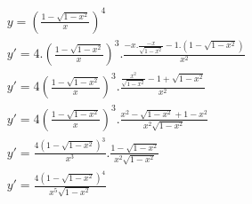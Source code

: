 \begin{ex}
\begin{align}
&y=\left(\frac{1-\sqrt{1-x^2}}{x}\right)^4\nonumber\\
&y'=4.\left(\frac{1-\sqrt{1-x^2}}{x}\right)^3.\frac{-x.\frac{-x}{\sqrt{1-x^2}}-1.(1-\sqrt{1-x^2})}{x^2}\nonumber\\
&y'=4\left(\frac{1-\sqrt{1-x^2}}{x}\right)^3.\frac{\frac{x^2}{\sqrt{1-x^2}}-1+\sqrt{1-x^2}}{x^2}\nonumber\\
&y'=4\left(\frac{1-\sqrt{1-x^2}}{x}\right)^3.\frac{x^2-\sqrt{1-x^2}+1-x^2}{x^2\sqrt{1-x^2}}\nonumber\\
&y'=\frac{4(1-\sqrt{1-x^2})^3}{x^3}.\frac{1-\sqrt{1-x^2}}{x^2\sqrt{1-x^2}}\nonumber\\
&y'=\frac{4(1-\sqrt{1-x^2})^4}{x^5\sqrt{1-x^2}}\nonumber
\end{align}
\end{ex}
